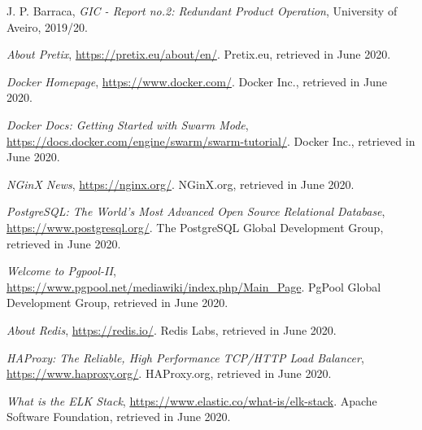 \documentclass[12pt]{article}
\begin{document}
\newpage
\begin{thebibliography}{9} %
  

  J. P. Barraca,
  \textit{GIC - Report no.2: Redundant Product Operation},
  University of Aveiro,
  2019/20.
  \vspace{-10pt}

  \textit{About Pretix},
  \url{https://pretix.eu/about/en/}.
  Pretix.eu,
  retrieved in June 2020.
  \vspace{-10pt}

  \textit{Docker Homepage},
  \url{https://www.docker.com/}.
  Docker Inc.,
  retrieved in June 2020.
  \vspace{-10pt}

  \textit{Docker Docs: Getting Started with Swarm Mode},
  \url{https://docs.docker.com/engine/swarm/swarm-tutorial/}.
  Docker Inc.,
  retrieved in June 2020.
  \vspace{-10pt}

  \textit{NGinX News},
  \url{https://nginx.org/}.
  NGinX.org,
  retrieved in June 2020.
  \vspace{-10pt}

  \textit{PostgreSQL: The World's Most Advanced Open Source Relational Database},
  \url{https://www.postgresql.org/}.
  The PostgreSQL Global Development Group,
  retrieved in June 2020.
  \vspace{-10pt}

  \textit{Welcome to Pgpool-II},
  \url{https://www.pgpool.net/mediawiki/index.php/Main_Page}.
  PgPool Global Development Group,
  retrieved in June 2020.
  \vspace{-10pt}

  \textit{About Redis},
  \url{https://redis.io/}.
  Redis Labs,
  retrieved in June 2020.
  \vspace{-10pt}

  \textit{HAProxy: The Reliable, High Performance TCP/HTTP Load Balancer},
  \url{https://www.haproxy.org/}.
  HAProxy.org,
  retrieved in June 2020.
  \vspace{-10pt}

  \textit{What is the ELK Stack},
  \url{https://www.elastic.co/what-is/elk-stack}.
  Apache Software Foundation,
  retrieved in June 2020.
  \vspace{-10pt}


\end{thebibliography}
\end{document}
